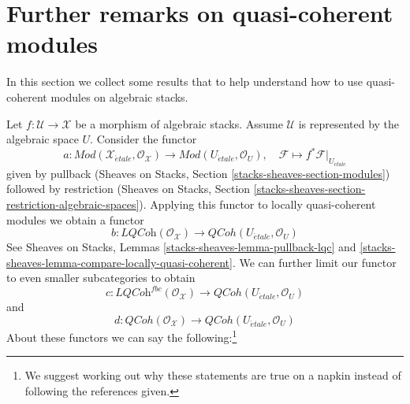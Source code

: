 \documentclass{stacks-project}
\theoremstyle{plain}
\theoremstyle{definition}
\theoremstyle{remark}
\numberwithin{equation}{subsection}
\def\etale{{\acute{e}tale}}
\def\QCoh{\mathit{QCoh}}
\begin{document}
\section{Further remarks on quasi-coherent modules}
\label{section-further-remarks}

\noindent
In this section we collect some results that to help understand how
to use quasi-coherent modules on algebraic stacks.

\medskip\noindent
Let $f : \mathcal{U} \to \mathcal{X}$ be a morphism of algebraic stacks.
Assume $\mathcal{U}$ is represented by the algebraic space $U$.
Consider the functor
$$
a :
\textit{Mod}(\mathcal{X}_\etale, \mathcal{O}_\mathcal{X})
\longrightarrow
\textit{Mod}(U_\etale, \mathcal{O}_U),\quad
\mathcal{F}
\longmapsto
f^*\mathcal{F}|_{U_\etale}
$$
given by pullback (Sheaves on Stacks, Section
\ref{stacks-sheaves-section-modules}) followed by restriction
(Sheaves on Stacks, Section
\ref{stacks-sheaves-section-restriction-algebraic-spaces}).
Applying this functor to locally quasi-coherent modules we obtain a functor
$$
b : \textit{LQCoh}(\mathcal{O}_\mathcal{X})
\longrightarrow
\QCoh(U_\etale, \mathcal{O}_U)
$$
See Sheaves on Stacks, Lemmas \ref{stacks-sheaves-lemma-pullback-lqc} and
\ref{stacks-sheaves-lemma-compare-locally-quasi-coherent}.
We can further limit our functor to even smaller subcategories to obtain
$$
c :
\textit{LQCoh}^{fbc}(\mathcal{O}_\mathcal{X})
\longrightarrow
\QCoh(U_\etale, \mathcal{O}_U)
$$
and
$$
d :
\QCoh(\mathcal{O}_\mathcal{X})
\longrightarrow
\QCoh(U_\etale, \mathcal{O}_U)
$$
About these functors we can say the following:\footnote{We suggest
working out why these statements are true on a napkin instead of
following the references given.}
\end{document}
